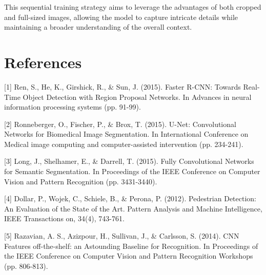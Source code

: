\documentclass{article}
\begin{document}
This sequential training strategy aims to leverage the advantages of both cropped and full-sized images, allowing the model
to capture intricate details while maintaining a broader understanding of the overall context.


\section*{References}


\medskip
{
\small

[1] Ren, S., He, K., Girshick, R., \& Sun, J. (2015). Faster R-CNN: Towards Real-Time Object
Detection with Region Proposal Networks. In Advances in neural information processing
systems (pp. 91-99).


[2] Ronneberger, O., Fischer, P., \& Brox, T. (2015). U-Net: Convolutional Networks for
Biomedical Image Segmentation. In International Conference on Medical image computing and
computer-assisted intervention (pp. 234-241).


[3] Long, J., Shelhamer, E., \& Darrell, T. (2015). Fully Convolutional Networks for Semantic
Segmentation. In Proceedings of the IEEE Conference on Computer Vision and Pattern Recognition
(pp. 3431-3440).


[4] Dollar, P., Wojek, C., Schiele, B., \& Perona, P. (2012). Pedestrian Detection: An Evaluation
of the State of the Art. Pattern Analysis and Machine Intelligence, IEEE Transactions on, 34(4), 743-761.


[5] Razavian, A. S., Azizpour, H., Sullivan, J., \& Carlsson, S. (2014). CNN Features off-the-shelf:
an Astounding Baseline for Recognition. In Proceedings of the IEEE Conference on Computer Vision
and Pattern Recognition Workshops (pp. 806-813).
}
\end{document}
